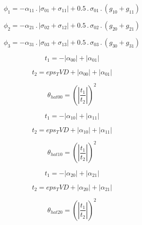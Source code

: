 \documentclass{article}
\begin{document}
\begin{dmath}\phi_{1} = - \alpha_{11} \,.\, \left|{\sigma_{0 1} + \sigma_{1 1}}\right| + 0.5 \,.\, \sigma_{0 1} \,.\, \left(g_{10} + g_{11}\right)\end{dmath}

\begin{dmath}\phi_{2} = - \alpha_{21} \,.\, \left|{\sigma_{0 2} + \sigma_{1 2}}\right| + 0.5 \,.\, \sigma_{0 2} \,.\, \left(g_{20} + g_{21}\right)\end{dmath}

\begin{dmath}\phi_{3} = - \alpha_{31} \,.\, \left|{\sigma_{0 3} + \sigma_{1 3}}\right| + 0.5 \,.\, \sigma_{0 3} \,.\, \left(g_{30} + g_{31}\right)\end{dmath}

\begin{dmath}t_{1} = - \left|{\alpha_{00}}\right| + \left|{\alpha_{01}}\right|\end{dmath}

\begin{dmath}t_{2} = eps_TVD + \left|{\alpha_{00}}\right| + \left|{\alpha_{01}}\right|\end{dmath}

\begin{dmath}\theta_{hat 00} = \left(\left|{\frac{t_{1}}{t_{2}}}\right| \right)^{2}\end{dmath}

\begin{dmath}t_{1} = - \left|{\alpha_{10}}\right| + \left|{\alpha_{11}}\right|\end{dmath}

\begin{dmath}t_{2} = eps_TVD + \left|{\alpha_{10}}\right| + \left|{\alpha_{11}}\right|\end{dmath}

\begin{dmath}\theta_{hat 10} = \left(\left|{\frac{t_{1}}{t_{2}}}\right| \right)^{2}\end{dmath}

\begin{dmath}t_{1} = - \left|{\alpha_{20}}\right| + \left|{\alpha_{21}}\right|\end{dmath}

\begin{dmath}t_{2} = eps_TVD + \left|{\alpha_{20}}\right| + \left|{\alpha_{21}}\right|\end{dmath}

\begin{dmath}\theta_{hat 20} = \left(\left|{\frac{t_{1}}{t_{2}}}\right| \right)^{2}\end{dmath}
\end{document}
